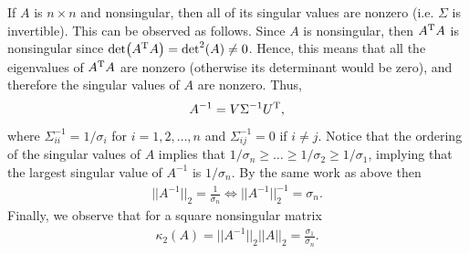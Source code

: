 If $A$ is $n \times n$ and nonsingular, then all of its singular values are nonzero (i.e. $\Sigma$ is invertible).
This can be observed as follows.
Since $A$ is nonsingular, then $A^{\rm T}A$ is nonsingular since $\det(A^{\rm T}A) = \det^2(A) \ne 0$.
Hence, this means that all the eigenvalues of $A^{\rm T}A$ are nonzero (otherwise its determinant would be zero), and therefore the singular values of $A$ are nonzero.
Thus, 
\begin{eqnarray}
    \label{eq:Ainvs}
    A^{-1} = V \Sigma^{-1} U^{\rm T} 
,\end{eqnarray}
where $\Sigma_{ii}^{-1} = 1/\sigma_{i}$ for $i = 1,2,\ldots,n$ and $\Sigma_{ij}^{-1} = 0$ if $i \ne j$.
Notice that the ordering of the singular values of $A$ implies that $1/\sigma_{n} \geq \ldots \geq 1/\sigma_2 \geq 1/\sigma_1$, implying that the largest singular value of $A^{-1}$ is $1/\sigma_{n}$.
By the same work as above then
\begin{eqnarray}
    \label{eq:spectral-radius-Ainvs}
    ||A^{-1}||_{2} = \frac{1}{\sigma_{n}} \Leftrightarrow ||A^{-1}||_{2}^{-1} = \sigma_{n}
.\end{eqnarray}
Finally, we observe that for a square nonsingular matrix
\begin{eqnarray}
    \label{eq:condition-number}
    \kappa_{2}(A) = ||A^{-1}||_{2}||A||_{2} = \frac{\sigma_1}{\sigma_{n}} 
.\end{eqnarray}




